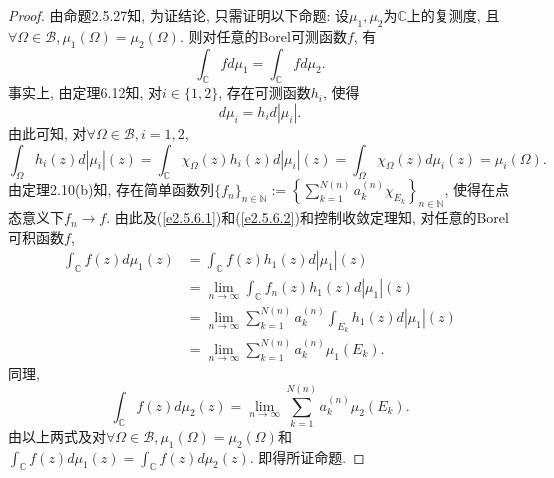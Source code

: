 \documentclass[UTF8,twoside]{ctexbook}
\newcommand{\h}{\mathscr}
\newcommand{\kx}{\mathbb}
\numberwithin{equation}{section}
\begin{document}
	\begin{proof}
		由命题2.5.27知, 为证结论, 只需证明以下命题: 设$\mu_1,\mu_2$为$\kx C$上的复测度, 且$\forall \Omega\in\h B, \mu_1(\Omega)=\mu_2(\Omega)$. 则对任意的Borel可测函数$f$, 有
		\[
		\int_{\kx C}fd\mu_1=\int_{\kx C}fd\mu_2.
		\]
		事实上, 由\cite{ydc2016}定理6.12知, 对$i\in\{1,2\}$, 存在可测函数$h_i$, 使得
		\begin{equation}\label{e2.5.6.1}
		d\mu_i=h_id|\mu_i|.
		\end{equation}
		由此可知, 对$\forall \Omega\in\h B, i=1,2$,
		\begin{equation}\label{e2.5.6.2}
		\int_{\Omega}h_i(z)d|\mu_i|(z)=\int_{\kx C}\chi_\Omega(z)h_i(z)d|\mu_i|(z)=\int_\Omega\chi_\Omega(z)d\mu_i(z)=\mu_i(\Omega).
		\end{equation}
		由\cite{folland2013real}定理2.10(b)知, 存在简单函数列$\{f_n\}_{n\in\kx N}:=\left\{\sum_{k=1}^{N(n)}a_k^{(n)}\chi_{E_k}\right\}_{n\in\kx N}$, 使得在点态意义下$f_n\rightarrow f$. 由此及(\ref{e2.5.6.1})和(\ref{e2.5.6.2})和控制收敛定理知, 对任意的Borel可积函数$f$,
		\[
		\begin{aligned}
		\int_{\kx C}f(z)d\mu_1(z)
		&=\int_{\kx C}f(z)h_1(z)d|\mu_1|(z)\\
		&=\lim_{n\rightarrow\infty}\int_{\kx C}f_n(z)h_1(z)d|\mu_1|(z)\\
		&=\lim_{n\rightarrow\infty}\sum_{k=1}^{N(n)}a_k^{(n)}\int_{E_k}h_1(z)d|\mu_1|(z)\\
		&=\lim_{n\rightarrow\infty}\sum_{k=1}^{N(n)}a_k^{(n)}\mu_1(E_k).
		\end{aligned}
		\]
		同理,
		\[
		\int_{\kx C}f(z)d\mu_2(z)=\lim_{n\rightarrow\infty}\sum_{k=1}^{N(n)}a_k^{(n)}\mu_2(E_k).
		\]
		由以上两式及对$\forall \Omega\in\h B,\mu_1(\Omega)=\mu_2(\Omega)$和$\int_{\kx C}f(z)d\mu_1(z)=\int_{\kx C}f(z)d\mu_2(z)$. 即得所证命题.
	\end{proof}
\end{document}
